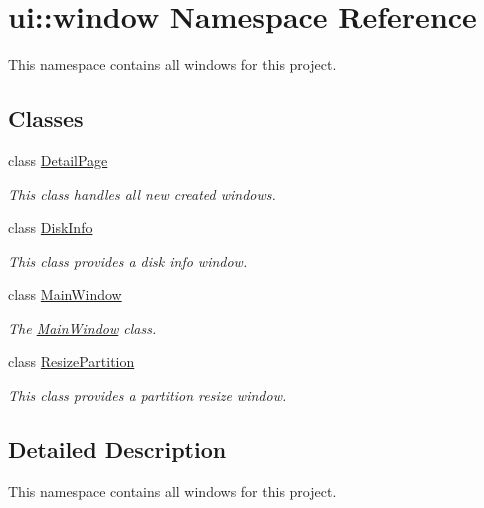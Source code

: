 \hypertarget{namespaceui_1_1window}{}\section{ui\+:\+:window Namespace Reference}
\label{namespaceui_1_1window}


This namespace contains all windows for this project.  


\subsection*{Classes}
\begin{DoxyCompactItemize}
\item 
class \mbox{\hyperlink{classui_1_1window_1_1_detail_page}{Detail\+Page}}
\begin{DoxyCompactList}\small\item\em This class handles all new created windows. \end{DoxyCompactList}\item 
class \mbox{\hyperlink{classui_1_1window_1_1_disk_info}{Disk\+Info}}
\begin{DoxyCompactList}\small\item\em This class provides a disk info window. \end{DoxyCompactList}\item 
class \mbox{\hyperlink{classui_1_1window_1_1_main_window}{Main\+Window}}
\begin{DoxyCompactList}\small\item\em The \mbox{\hyperlink{classui_1_1window_1_1_main_window}{Main\+Window}} class. \end{DoxyCompactList}\item 
class \mbox{\hyperlink{classui_1_1window_1_1_resize_partition}{Resize\+Partition}}
\begin{DoxyCompactList}\small\item\em This class provides a partition resize window. \end{DoxyCompactList}\end{DoxyCompactItemize}


\subsection{Detailed Description}
This namespace contains all windows for this project. 